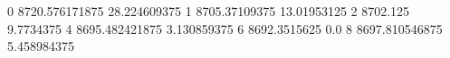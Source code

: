 0 8720.576171875 28.224609375
1 8705.37109375 13.01953125
2 8702.125 9.7734375
4 8695.482421875 3.130859375
6 8692.3515625 0.0
8 8697.810546875 5.458984375
